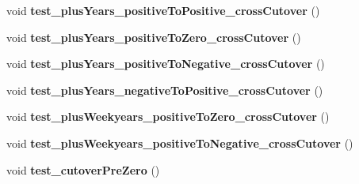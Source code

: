 \begin{DoxyCompactItemize}
\item 
\hypertarget{classorg_1_1joda_1_1time_1_1chrono_1_1_test_g_j_date_a0c40c303ea7bda0a6c3233cf818d2f85}{void {\bfseries test\-\_\-plus\-Years\-\_\-positive\-To\-Positive\-\_\-cross\-Cutover} ()}\label{classorg_1_1joda_1_1time_1_1chrono_1_1_test_g_j_date_a0c40c303ea7bda0a6c3233cf818d2f85}

\item 
\hypertarget{classorg_1_1joda_1_1time_1_1chrono_1_1_test_g_j_date_a2d1eec700580c362707af76e855dee73}{void {\bfseries test\-\_\-plus\-Years\-\_\-positive\-To\-Zero\-\_\-cross\-Cutover} ()}\label{classorg_1_1joda_1_1time_1_1chrono_1_1_test_g_j_date_a2d1eec700580c362707af76e855dee73}

\item 
\hypertarget{classorg_1_1joda_1_1time_1_1chrono_1_1_test_g_j_date_ac2867e739814ea54657bb306de6cef6e}{void {\bfseries test\-\_\-plus\-Years\-\_\-positive\-To\-Negative\-\_\-cross\-Cutover} ()}\label{classorg_1_1joda_1_1time_1_1chrono_1_1_test_g_j_date_ac2867e739814ea54657bb306de6cef6e}

\item 
\hypertarget{classorg_1_1joda_1_1time_1_1chrono_1_1_test_g_j_date_ab104737cb91dc273c26bc718b1ac9c71}{void {\bfseries test\-\_\-plus\-Years\-\_\-negative\-To\-Positive\-\_\-cross\-Cutover} ()}\label{classorg_1_1joda_1_1time_1_1chrono_1_1_test_g_j_date_ab104737cb91dc273c26bc718b1ac9c71}

\item 
\hypertarget{classorg_1_1joda_1_1time_1_1chrono_1_1_test_g_j_date_a15c45402ac6857d487402fd4f4d45696}{void {\bfseries test\-\_\-plus\-Weekyears\-\_\-positive\-To\-Zero\-\_\-cross\-Cutover} ()}\label{classorg_1_1joda_1_1time_1_1chrono_1_1_test_g_j_date_a15c45402ac6857d487402fd4f4d45696}

\item 
\hypertarget{classorg_1_1joda_1_1time_1_1chrono_1_1_test_g_j_date_a7fbb4d65d233b7c9d5c6a430c1075b82}{void {\bfseries test\-\_\-plus\-Weekyears\-\_\-positive\-To\-Negative\-\_\-cross\-Cutover} ()}\label{classorg_1_1joda_1_1time_1_1chrono_1_1_test_g_j_date_a7fbb4d65d233b7c9d5c6a430c1075b82}

\item 
\hypertarget{classorg_1_1joda_1_1time_1_1chrono_1_1_test_g_j_date_a7b9418c178a07a667ea214b12efd112b}{void {\bfseries test\-\_\-cutover\-Pre\-Zero} ()}\label{classorg_1_1joda_1_1time_1_1chrono_1_1_test_g_j_date_a7b9418c178a07a667ea214b12efd112b}

\end{DoxyCompactItemize}
